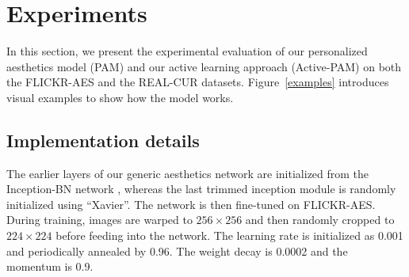 \section{Experiments}

In this section, we present the experimental evaluation of our personalized aesthetics model (PAM) and our active learning approach (Active-PAM) on both the FLICKR-AES and the REAL-CUR datasets.
Figure~\ref{examples} introduces visual examples to show how the model works. 
\subsection{Implementation details}
 The earlier layers of our generic aesthetics network are initialized from the Inception-BN network \cite{ioffe2015batch}, whereas the last trimmed inception module is randomly initialized using ``Xavier''. The network is then fine-tuned on FLICKR-AES. During training, images are warped to $256 \times 256$ and then randomly cropped to $224 \times 224$ before feeding into the network. The learning rate is initialized as 0.001 and periodically annealed by 0.96. The weight decay is 0.0002 and the momentum is 0.9. 




